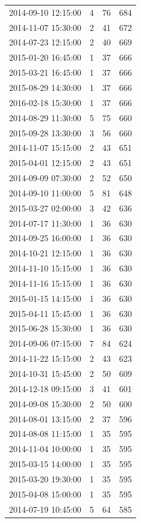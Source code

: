\begin{tabular}{lrrr}
2014-09-10 12:15:00 & 4 & 76 & 684 \\
2014-11-07 15:30:00 & 2 & 41 & 672 \\
2014-07-23 12:15:00 & 2 & 40 & 669 \\
2015-01-20 16:45:00 & 1 & 37 & 666 \\
2015-03-21 16:45:00 & 1 & 37 & 666 \\
2015-08-29 14:30:00 & 1 & 37 & 666 \\
2016-02-18 15:30:00 & 1 & 37 & 666 \\
2014-08-29 11:30:00 & 5 & 75 & 660 \\
2015-09-28 13:30:00 & 3 & 56 & 660 \\
2014-11-07 15:15:00 & 2 & 43 & 651 \\
2015-04-01 12:15:00 & 2 & 43 & 651 \\
2014-09-09 07:30:00 & 2 & 52 & 650 \\
2014-09-10 11:00:00 & 5 & 81 & 648 \\
2015-03-27 02:00:00 & 3 & 42 & 636 \\
2014-07-17 11:30:00 & 1 & 36 & 630 \\
2014-09-25 16:00:00 & 1 & 36 & 630 \\
2014-10-21 12:15:00 & 1 & 36 & 630 \\
2014-11-10 15:15:00 & 1 & 36 & 630 \\
2014-11-16 15:15:00 & 1 & 36 & 630 \\
2015-01-15 14:15:00 & 1 & 36 & 630 \\
2015-04-11 15:45:00 & 1 & 36 & 630 \\
2015-06-28 15:30:00 & 1 & 36 & 630 \\
2014-09-06 07:15:00 & 7 & 84 & 624 \\
2014-11-22 15:15:00 & 2 & 43 & 623 \\
2014-10-31 15:45:00 & 2 & 50 & 609 \\
2014-12-18 09:15:00 & 3 & 41 & 601 \\
2014-09-08 15:30:00 & 2 & 50 & 600 \\
2014-08-01 13:15:00 & 2 & 37 & 596 \\
2014-08-08 11:15:00 & 1 & 35 & 595 \\
2014-11-04 10:00:00 & 1 & 35 & 595 \\
2015-03-15 14:00:00 & 1 & 35 & 595 \\
2015-03-20 19:30:00 & 1 & 35 & 595 \\
2015-04-08 15:00:00 & 1 & 35 & 595 \\
2014-07-19 10:45:00 & 5 & 64 & 585 \\

\end{tabular}
